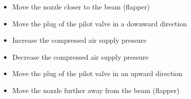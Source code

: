 \begin{itemize}
\item{} Move the nozzle closer to the beam (flapper)
\vskip 5pt 
\item{} Move the plug of the pilot valve in a downward direction
\vskip 5pt 
\item{} Increase the compressed air supply pressure
\vskip 5pt 
\item{} Decrease the compressed air supply pressure 
\vskip 5pt 
\item{} Move the plug of the pilot valve in an upward direction
\vskip 5pt 
\item{} Move the nozzle further away from the beam (flapper) 
\end{itemize}





